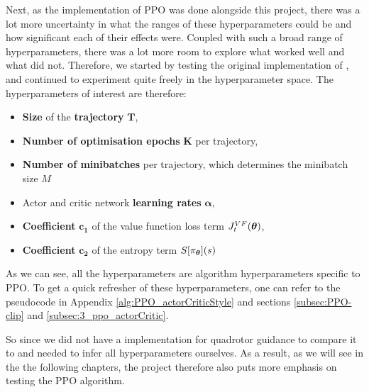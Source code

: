 Next, as the implementation of PPO was done alongside this project, there was a lot more uncertainty in what the ranges of these hyperparameters could be and how significant each of their effects were. Coupled with such a broad range of hyperparameters, there was a lot more room to explore what worked well and what did not. 
Therefore, we started by testing the original implementation of \cite{PPO}, and continued to experiment quite freely in the hyperparameter space.
The hyperparameters of interest are therefore:
\begin{itemize}
    \item \textbf{Size} of the \textbf{trajectory} $\boldsymbol{T}$,
    \item \textbf{Number of optimisation epochs} $\boldsymbol{K}$ per trajectory,
    \item \textbf{Number of minibatches }per trajectory, which determines the minibatch size $M$
    \item Actor and critic network \textbf{learning rates} $\boldsymbol{\alpha}$,
    \item \textbf{Coefficient} $\boldsymbol{c_1}$ of the value function loss term $J_t^{VF}(\boldsymbol{\theta})$,
    \item \textbf{Coefficient} $\boldsymbol{c_2}$ of the entropy term $S[\pi_{\boldsymbol{\theta}}](s)$
\end{itemize}
As we can see, all the hyperparameters are algorithm hyperparameters specific to PPO. To get a quick refresher of these hyperparameters, one can refer to the pseudocode in Appendix \ref{alg:PPO_actorCriticStyle} and sections \ref{subsec:PPO-clip} and \ref{subsec:3_ppo_actorCritic}. 

So since we did not have a implementation for quadrotor guidance to compare it to and needed to infer all hyperparameters ourselves. As a result, as we will see in the the following chapters, the project therefore also puts more emphasis on testing the PPO algorithm.